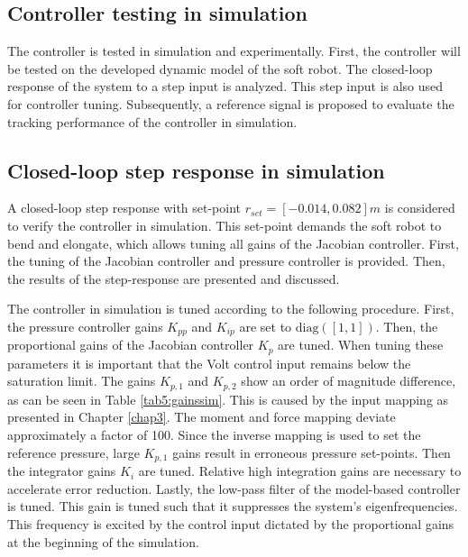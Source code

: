 \subsection{Controller testing in simulation}

The controller is tested in simulation and experimentally. First, the controller will be tested on the developed dynamic model of the soft robot. The closed-loop response of the system to a step input is analyzed. This step input is also used for controller tuning. Subsequently, a reference signal is proposed to evaluate the tracking performance of the controller in simulation. 


\subsection*{Closed-loop step response in simulation}

A closed-loop step response with set-point $r_{set} = [-0.014,0.082]m$ is considered to verify the controller in simulation. This set-point demands the soft robot to bend and elongate, which allows tuning all gains of the Jacobian controller. First, the tuning of the Jacobian controller and pressure controller is provided. Then, the results of the step-response are presented and discussed. 

The controller in simulation is tuned according to the following procedure. First, the pressure controller gains $K_{pp}$ and $K_{ip}$ are set to $\text{diag}([1,1])$. Then, the proportional gains of the Jacobian controller $K_p$ are tuned. When tuning these parameters it is important that the Volt control input remains below the saturation limit. The gains $K_{p,1}$ and $K_{p,2}$ show an order of magnitude difference, as can be seen in Table \ref{tab5:gainssim}. This is caused by the input mapping as presented in Chapter \ref{chap3}. The moment and force mapping deviate approximately a factor of 100. Since the inverse mapping is used to set the reference pressure, large $K_{p,1}$ gains result in erroneous pressure set-points. Then the integrator gains $K_i$ are tuned. Relative high integration gains are necessary to accelerate error reduction. Lastly, the low-pass filter of the model-based controller is tuned. This gain is tuned such that it suppresses the system's eigenfrequencies. This frequency is excited by the control input dictated by the proportional gains at the beginning of the simulation. 



